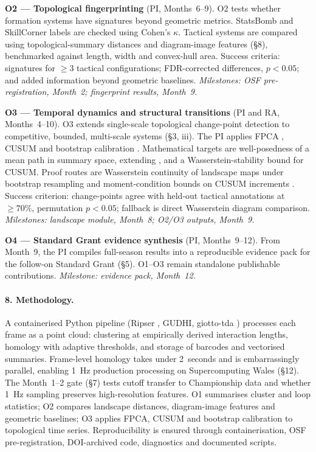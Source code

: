 \textbf{O2 --- Topological fingerprinting} (PI, Months~6--9). O2 tests whether formation systems have signatures beyond geometric metrics. StatsBomb and SkillCorner labels are checked using Cohen's $\kappa$. Tactical systems are compared using topological-summary distances \citep{Chazal2014,Bubenik2015} and diagram-image features (\S8), benchmarked against length, width and convex-hull area. Success criteria: signatures for $\ge 3$ tactical configurations; FDR-corrected differences, $p < 0.05$; and added information beyond geometric baselines. \emph{Milestones: OSF pre-registration, Month~2; fingerprint results, Month~9.}

\textbf{O3 --- Temporal dynamics and structural transitions} (PI and RA, Months~4--10). O3 extends single-scale topological change-point detection \citep{Gu2022} to competitive, bounded, multi-scale systems (\S3, iii). The PI applies FPCA \citep{RamsaySilverman2005}, CUSUM \citep{Page1954} and bootstrap calibration \citep{Chazal2014}. Mathematical targets are well-posedness of a mean path in summary space, extending \citep{Chazal2014}, and a Wasserstein-stability bound for CUSUM. Proof routes are Wasserstein continuity of landscape maps under bootstrap resampling \citep{Chazal2014} and moment-condition bounds on CUSUM increments \citep{Page1954}. Success criterion: change-points agree with held-out tactical annotations at $\ge 70\%$, permutation $p < 0.05$; fallback is direct Wasserstein diagram comparison. \emph{Milestones: landscape module, Month~8; O2/O3 outputs, Month~9.}

\textbf{O4 --- Standard Grant evidence synthesis} (PI, Months~9--12). From Month~9, the PI compiles full-season results into a reproducible evidence pack for the follow-on Standard Grant (\S5). O1--O3 remain standalone publishable contributions. \emph{Milestone: evidence pack, Month~12.}

\paragraph{8. Methodology.}
A containerised Python pipeline (Ripser \citep{Bauer2021}, GUDHI, giotto-tda \citep{Tauzin2021}) processes each frame as a point cloud: clustering at empirically derived interaction lengths, homology with adaptive thresholds, and storage of barcodes and vectorised summaries. Frame-level homology takes under 2~seconds and is embarrassingly parallel, enabling 1~Hz production processing on Supercomputing Wales (\S12). The Month~1--2 gate (\S7) tests cutoff transfer to Championship data and whether 1~Hz sampling preserves high-resolution features. O1 summarises cluster and loop statistics; O2 compares landscape distances, diagram-image features and geometric baselines; O3 applies FPCA, CUSUM and bootstrap calibration to topological time series. Reproducibility is ensured through containerisation, OSF pre-registration, DOI-archived code, diagnostics and documented scripts.

